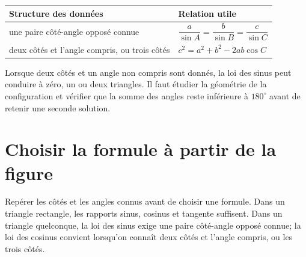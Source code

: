 \begin{center}
\begin{tabularx}{\textwidth}{@{}p{}Y@{}}
\toprule
Structure des données & Relation utile\\\midrule
une paire côté-angle opposé connue & $\dfrac a{\sin A}=\dfrac b{\sin B}=\dfrac c{\sin C}$\\[1em]
deux côtés et l'angle compris, ou trois côtés & $c^2=a^2+b^2-2ab\cos C$\\
\bottomrule
\end{tabularx}
\end{center}

\begin{center}
\end{center}

\begin{warningbox}
Lorsque deux côtés et un angle non compris sont donnés, la loi des sinus peut conduire à zéro, un ou deux triangles. Il faut étudier la géométrie de la configuration et vérifier que la somme des angles reste inférieure à $180^\circ$ avant de retenir une seconde solution.
\end{warningbox}

\section{Choisir la formule à partir de la figure}
\label{manual:section:15.03}

\begin{visualbox}
Repérer les côtés et les angles connus avant de choisir une formule. Dans un triangle rectangle, les rapports sinus, cosinus et tangente suffisent. Dans un triangle quelconque, la loi des sinus exige une paire côté-angle opposé connue; la loi des cosinus convient lorsqu'on connaît deux côtés et l'angle compris, ou les trois côtés.
\end{visualbox}

